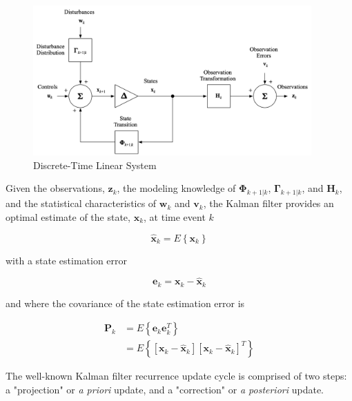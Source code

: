 \begin{figure}[ht]
    \centering
    \includegraphics[width=0.95\textwidth]{images/DT-Linear-System.png}
    \caption{Discrete-Time Linear System}
    \label{fig:dt-linear-system}
\end{figure}

Given the observations, $\mathbf{z}_k$,
the modeling knowledge of $\mathbf{\Phi}_{k+1|k}$, $\mathbf{\Gamma}_{k+1|k}$, and $\mathbf{H}_k$,
and the statistical characteristics of $\mathbf{w}_k$ and $\mathbf{v}_k$,
the Kalman filter provides an optimal estimate of the state, $\mathbf{x}_k$, at time event $k$

\begin{equation*}
    \hat{\mathbf{x}}_k = E \left\{ \mathbf{x}_k \right\}
\end{equation*}

with a state estimation error

\begin{equation*}
    \mathbf{e}_k = \mathbf{x}_{k} - \hat{\mathbf{x}}_k
\end{equation*}

and where the covariance of the state estimation error is

\begin{equation*}
    \begin{aligned}
        \mathbf{P}_k &= E \left\{ \mathbf{e}_k \mathbf{e}_k^T \right\} \\
        &= E \left\{ \left[ \mathbf{x}_{k} - \hat{\mathbf{x}}_k \right] \left[ \mathbf{x}_{k} - \hat{\mathbf{x}}_k \right]^T \right\}
    \end{aligned}
\end{equation*}

The well-known Kalman filter \cite{kalman1960} recurrence update cycle is comprised of two steps:
a "projection" or \textit{a priori} update, and a "correction" or \textit{a posteriori} update.

